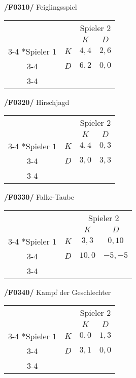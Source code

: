 \textbf{/F0310/} 
Feiglingsspiel
\begin{table}[H]
\centering
\setlength{\extrarowheight}{2pt}
\begin{tabular}{cc|c|c|}
  & \multicolumn{1}{c}{} & \multicolumn{2}{c}{Spieler $2$} \\
  & \multicolumn{1}{c}{} & \multicolumn{1}{c}{$K$} & \multicolumn{1}{c}{$D$} \\\cline{3-4}
  \multirow{2}*{Spieler $1$} & $K$ & $4,4$ & $2,6$ \\\cline{3-4} 
  & $D$ & $6,2$ & $0,0$ \\\cline{3-4}
\end{tabular}
\end{table}

\textbf{/F0320/} 
Hirschjagd
\begin{table}[H]
\centering
\setlength{\extrarowheight}{2pt}
\begin{tabular}{cc|c|c|}
  & \multicolumn{1}{c}{} & \multicolumn{2}{c}{Spieler $2$} \\
  & \multicolumn{1}{c}{} & \multicolumn{1}{c}{$K$} & \multicolumn{1}{c}{$D$} \\\cline{3-4}
  \multirow{2}*{Spieler $1$} & $K$ & $4,4$ & $0,3$ \\\cline{3-4} 
  & $D$ & $3,0$ & $3,3$ \\\cline{3-4}
\end{tabular}
\end{table}

\textbf{/F0330/} 
Falke-Taube
\begin{table}[H]
\centering
\setlength{\extrarowheight}{2pt}
\begin{tabular}{cc|c|c|}
  & \multicolumn{1}{c}{} & \multicolumn{2}{c}{Spieler $2$} \\
  & \multicolumn{1}{c}{} & \multicolumn{1}{c}{$K$} & \multicolumn{1}{c}{$D$} \\\cline{3-4}
  \multirow{2}*{Spieler $1$} & $K$ & $3,3$ & $0,10$ \\\cline{3-4} 
  & $D$ & $10,0$ & $-5,-5$ \\\cline{3-4}
\end{tabular}
\end{table}

\textbf{/F0340/} 
Kampf der Geschlechter
\begin{table}[H]
\centering
\setlength{\extrarowheight}{2pt}
\begin{tabular}{cc|c|c|}
  & \multicolumn{1}{c}{} & \multicolumn{2}{c}{Spieler $2$} \\
  & \multicolumn{1}{c}{} & \multicolumn{1}{c}{$K$} & \multicolumn{1}{c}{$D$} \\\cline{3-4}
  \multirow{2}*{Spieler $1$} & $K$ & $0,0$ & $1,3$ \\\cline{3-4} 
  & $D$ & $3,1$ & $0,0$ \\\cline{3-4}
\end{tabular}
\end{table}

